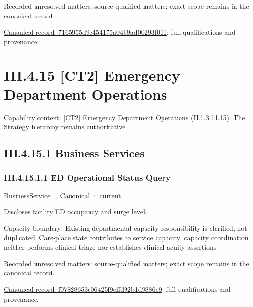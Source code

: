 {\small Recorded unresolved matters: source-qualified matters; exact scope remains in the canonical record.}\par
{\footnotesize \href{../../../../continuum/business/business-process/7165955d9c454175a04b9ad00293f011.md}{Canonical record: 7165955d9c454175a04b9ad00293f011}; full qualifications and provenance.}\par
\section*{III.4.15 [CT2] Emergency Department Operations}
\label{navigation:III.4.15}

{\small Capability context: \hyperref[element:24a4b5815faa4d369bc756a6e97d3e9e]{[CT2] Emergency Department Operations} (II.1.3.11.15). The Strategy hierarchy remains authoritative.}\par
\subsection*{III.4.15.1 Business Services}
\label{navigation:III.4.15.1}

\subsubsection*{III.4.15.1.1 ED Operational Status Query}
\label{navigation:III.4.15.1.1}

\label{element:f07828653c06425f9effd92b1d9886c9}
{\small BusinessService · Canonical · current}\par

Discloses facility ED occupancy and surge level.



Capacity boundary: Existing departmental capacity responsibility is clarified, not duplicated. Care-place state contributes to service capacity; capacity coordination neither performs clinical triage nor establishes clinical acuity assertions.


{\small Recorded unresolved matters: source-qualified matters; exact scope remains in the canonical record.}\par
{\footnotesize \href{../../../../continuum/business/business-service/f07828653c06425f9effd92b1d9886c9.md}{Canonical record: f07828653c06425f9effd92b1d9886c9}; full qualifications and provenance.}\par
